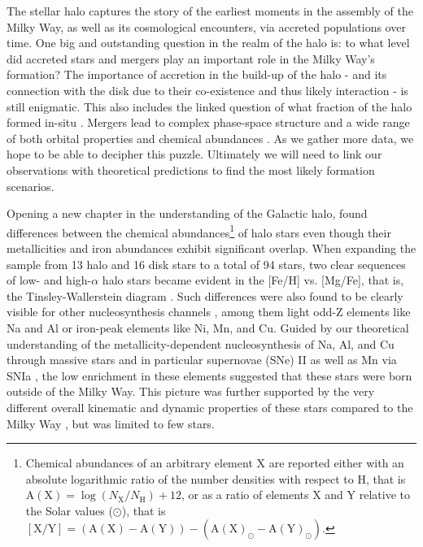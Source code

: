 \documentclass[fleqn,usenatbib]{mnras}
\begin{document}
The stellar halo captures the story of the earliest moments in the assembly of the Milky Way, as well as its cosmological encounters, via accreted populations over time. One big and outstanding question in the realm of the halo is: to what level did accreted stars and mergers play an important role in the Milky Way's formation? The importance of accretion in the build-up of the halo - and its connection with the disk due to their co-existence and thus likely interaction - is still enigmatic. This also includes the linked question of what fraction of the halo formed in-situ \citep{BlandHawthorn_Gerhard2016}. Mergers lead to complex phase-space structure and a wide range of both orbital properties and chemical abundances \citep[e.g.][]{Amorisco2017, JeanBptiste2017, Monachesi2019, Koppelman2020b}. As we gather more data, we hope to be able to decipher this puzzle. Ultimately we will need to link our observations with theoretical predictions to find the most likely formation scenarios.

Opening a new chapter in the understanding of the Galactic halo, \citet{Nissen1997b} found differences between the chemical abundances\footnote{Chemical abundances of an arbitrary element X are reported either with an absolute logarithmic ratio of the number densities with respect to H, that is $\mathrm{A(X)} = \log \left(N_\mathrm{X}/N_\mathrm{H} \right) + 12$, or as a ratio of elements X and Y relative to the Solar values ($\odot$), that is $\mathrm{[X/Y]} = \left( \mathrm{A(X)} -\mathrm{ A(Y)} \right) - \left( \mathrm{A(X)}_\odot -\mathrm{A(Y)}_\odot \right)$.} of halo stars even though their metallicities and iron abundances exhibit significant overlap. When expanding the sample from 13 halo and 16 disk stars to a total of 94 stars, two clear sequences of low- and high-$\alpha$ halo stars became evident in the [Fe/H] vs. [Mg/Fe], that is, the Tinsley-Wallerstein diagram \citep{Nissen2010}. Such differences were also found to be clearly visible for other nucleosynthesis channels \citep{Nissen2010, Nissen2011, Ting2012, Hawkins2015}, among them light odd-Z elements like Na and Al or iron-peak elements like Ni, Mn, and Cu. Guided by our theoretical understanding of the metallicity-dependent nucleosynthesis of Na, Al, and Cu through massive stars and in particular supernovae (SNe) II as well as Mn via SNIa \citep[e.g.][]{Kobayashi2006,Kobayashi2020}, the low enrichment in these elements suggested that these stars were born outside of the Milky Way. This picture was further supported by the very different overall kinematic and dynamic properties of these stars compared to the Milky Way \citep{Nissen2010, Schuster2012}, but was limited to few stars.
\end{document}
